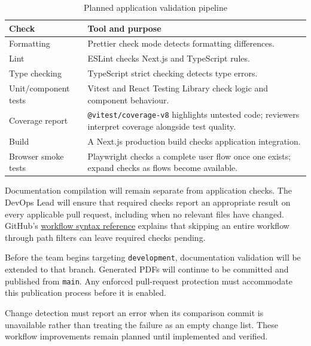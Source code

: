 \documentclass{article}
\begin{document}
\begin{table}[!htbp]
\caption{Planned application validation pipeline}
\label{tab:application-checks}
\small
\begin{tabularx}{\textwidth}{@{}P{0.27\textwidth}Y@{}}
\toprule
\textbf{Check} & \textbf{Tool and purpose}\\
\midrule
Formatting & Prettier check mode detects formatting differences.\\
\addlinespace
Lint & ESLint checks Next.js and TypeScript rules.\\
\addlinespace
Type checking & TypeScript strict checking detects type errors.\\
\addlinespace
Unit/component tests & Vitest and React Testing Library check logic
and component behaviour.\\
\addlinespace
Coverage report & \texttt{@vitest/coverage-v8} highlights untested code;
reviewers interpret coverage alongside test quality.\\
\addlinespace
Build & A Next.js production build checks application integration.\\
\addlinespace
Browser smoke tests & Playwright checks a complete user flow once one
exists; expand checks as flows become available.\\
\bottomrule
\end{tabularx}
\end{table}

Documentation compilation will remain separate from application
checks. The DevOps Lead will ensure that required checks report
an appropriate result on every applicable pull request, including
when no relevant files have changed. GitHub's
\href{https://docs.github.com/en/actions/reference/workflows-and-actions/workflow-syntax}
{workflow syntax reference} explains that skipping an entire
workflow through path filters can leave required checks pending.

Before the team begins targeting \texttt{development}, documentation
validation will be extended to that branch. Generated PDFs will
continue to be committed and published from \texttt{main}.
Any enforced pull-request protection must accommodate this
publication process before it is enabled.

Change detection must report an error when its comparison commit
is unavailable rather than treating the failure as an empty
change list. These workflow improvements remain planned until
implemented and verified.
\end{document}
